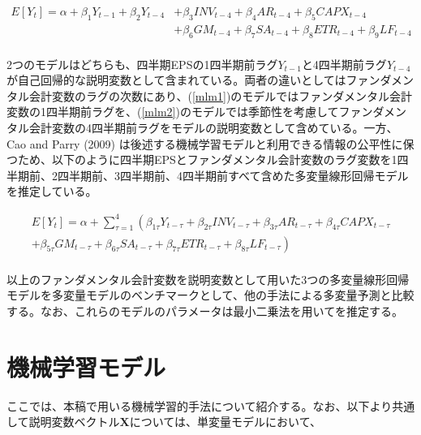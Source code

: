 \documentclass[a4paper, 12pt]{jsreport}
\begin{document}
\begin{equation}
  \begin{split}
    \label{mlm2}
    E[Y_t] = \alpha + \beta_1Y_{t-1} + \beta_2Y_{t-4} 
    &+ \beta_3INV_{t-4} + \beta_4AR_{t-4} + \beta_5CAPX_{t-4} \\
    &+ \beta_6GM_{t-4} + \beta_7SA_{t-4} + \beta_8ETR_{t-4} + \beta_9LF_{t-4} \\
  \end{split}
\end{equation}

2つのモデルはどちらも、四半期EPSの1四半期前ラグ$Y_{t-1}$と4四半期前ラグ$Y_{t-4}$が自己回帰的な説明変数として含まれている。両者の違いとしてはファンダメンタル会計変数のラグの次数にあり、(\ref{mlm1})のモデルではファンダメンタル会計変数の1四半期前ラグを、(\ref{mlm2})のモデルでは季節性を考慮してファンダメンタル会計変数の4四半期前ラグをモデルの説明変数として含めている。一方、Cao and Parry (2009) は後述する機械学習モデルと利用できる情報の公平性に保つため、以下のように四半期EPSとファンダメンタル会計変数のラグ変数を1四半期前、2四半期前、3四半期前、4四半期前すべて含めた多変量線形回帰モデルを推定している。

\begin{equation}
  \begin{split}
    E[Y_t] = \alpha + \sum^{4}_{\tau=1} \left( \beta_{1\tau}Y_{t-\tau} 
    + \beta_{2\tau}INV_{t-\tau} + \beta_{3\tau}AR_{t-\tau} + \beta_{4\tau}CAPX_{t-\tau} \right. \\
    \left. + \beta_{5\tau}GM_{t-\tau} + \beta_{6\tau}SA_{t-\tau} + \beta_{7\tau}ETR_{t-\tau} + \beta_{8\tau}LF_{t-\tau} \right) \\
  \end{split}
\end{equation}

以上のファンダメンタル会計変数を説明変数として用いた3つの多変量線形回帰モデルを多変量モデルのベンチマークとして、他の手法による多変量予測と比較する。なお、これらのモデルのパラメータは最小二乗法を用いてを推定する。

\section{機械学習モデル}


ここでは、本稿で用いる機械学習的手法について紹介する。なお、以下より共通して説明変数ベクトル$\bm{X}$については、単変量モデルにおいて、
\end{document}
